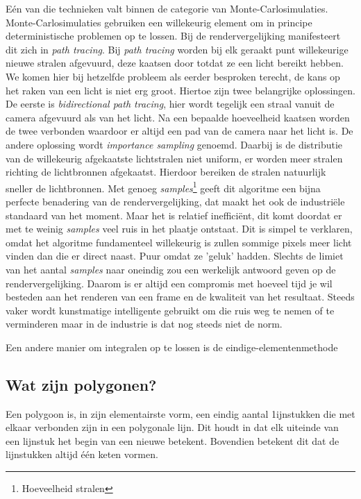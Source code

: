 \documentclass[12pt, a4paper]{article}
\begin{document}
Eén van die technieken valt binnen de categorie van Monte-Carlosimulaties. Monte-Carlosimulaties gebruiken een willekeurig element  om in principe deterministische problemen op te lossen. Bij de rendervergelijking manifesteert dit zich in \emph{path tracing}. Bij \emph{path tracing} worden bij elk geraakt punt willekeurige nieuwe stralen afgevuurd, deze kaatsen door totdat ze een licht bereikt hebben. We komen hier bij hetzelfde probleem als eerder besproken terecht, de kans op het raken van een licht is niet erg groot. Hiertoe zijn twee belangrijke oplossingen. De eerste is \emph{bidirectional path tracing}, hier wordt tegelijk een straal vanuit de camera afgevuurd als van het licht. Na een bepaalde hoeveelheid kaatsen worden de twee verbonden waardoor er altijd een pad van de camera naar het licht is. De andere oplossing wordt \emph{importance sampling} genoemd. Daarbij is de distributie van de willekeurig afgekaatste lichtstralen niet uniform, er worden meer stralen richting de lichtbronnen afgekaatst. Hierdoor bereiken de stralen natuurlijk sneller de lichtbronnen. Met genoeg \emph{samples}\footnote{Hoeveelheid stralen} geeft dit algoritme een bijna perfecte benadering van de rendervergelijking, dat maakt het ook de industriële standaard van het moment. Maar het is relatief inefficiënt, dit komt doordat er met te weinig \emph{samples} veel ruis in het plaatje ontstaat. Dit is simpel te verklaren, omdat het algoritme fundamenteel willekeurig is zullen sommige pixels meer licht vinden dan die er direct naast. Puur omdat ze 'geluk' hadden. Slechts de limiet van het aantal \emph{samples} naar oneindig zou een werkelijk antwoord geven op de rendervergelijking. Daarom is er altijd een compromis met hoeveel tijd je wil besteden aan het renderen van een frame en de kwaliteit van het resultaat. Steeds vaker wordt kunstmatige intelligente gebruikt om die ruis weg te nemen of te verminderen \cite{MonteCarloDenoiser} maar in de industrie is dat nog steeds niet de norm. 

Een andere manier om integralen op te lossen is de eindige-elementenmethode

\subsection{Wat zijn polygonen?}
Een polygoon is, in zijn elementairste vorm, een eindig aantal 1ijnstukken die met elkaar verbonden zijn in een polygonale lijn. Dit houdt in dat elk uiteinde van een lijnstuk het begin van een nieuwe betekent. Bovendien betekent dit dat de lijnstukken altijd één keten vormen. 
\end{document}

